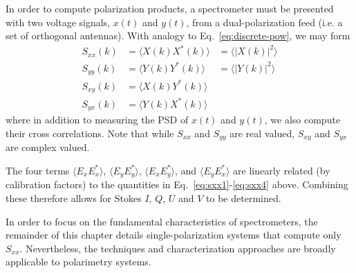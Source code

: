 \documentclass{ws-rv961x669}
\begin{document}
In order to compute polarization products, a spectrometer must be presented with two voltage signals, $x(t)$ and $y(t)$, from a dual-polarization feed (i.e. a set of orthogonal antennas). With analogy to Eq.~\ref{eq:discrete-pow}, we may form 
\begin{eqnarray}
S_{xx}(k) & =  \langle X(k)X^*(k)\rangle  & = \langle |X(k)|^2\rangle \label{eq:sxx1} \\
S_{yy}(k) & =  \langle Y(k)Y^*(k)\rangle  & = \langle |Y(k)|^2\rangle \\
S_{xy}(k) & =  \langle X(k)Y^*(k)\rangle  & \\
S_{yx}(k) & =  \langle Y(k)X^*(k)\rangle  & \label{eq:sxx4}
\end{eqnarray}
where in addition to measuring the PSD of $x(t)$ and $y(t)$, we also compute their cross correlations.  Note that while $S_{xx}$ and $S_{yy}$ are real valued, $S_{xy}$ and $S_{yx}$ are complex valued.

The four terms $\langle E_x E_x^*\rangle$, $\langle E_y E_y^* \rangle$, $\langle E_x E_y^* \rangle$, and $\langle E_y E_x^* \rangle$ are linearly related (by calibration factors) to the quantities in Eq.~\ref{eq:sxx1}-\ref{eq:sxx4} above. Combining these therefore allows for Stokes $I$, $Q$, $U$ and $V$ to be determined.

In order to focus on the fundamental characteristics of spectrometers, the remainder of this chapter details single-polarization systems that compute only $S_{xx}$. Nevertheless, the techniques and characterization approaches are broadly applicable to polarimetry systems.


\end{document}

